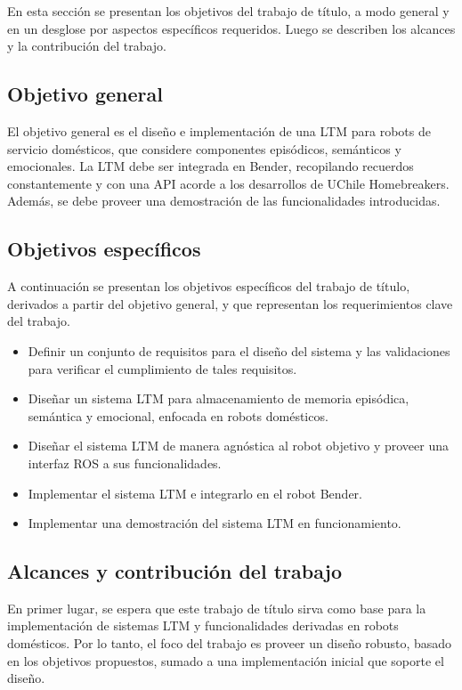 En esta sección se presentan los objetivos del trabajo de título, a modo general y en un desglose por aspectos específicos requeridos. Luego se describen los alcances y la contribución del trabajo. 

\subsection{Objetivo general}

El objetivo general es el diseño e implementación de una LTM para robots de servicio domésticos, que considere componentes episódicos, semánticos y emocionales. La LTM debe ser integrada en Bender, recopilando recuerdos constantemente y con una API acorde a los desarrollos de UChile Homebreakers. Además, se debe proveer una demostración de las funcionalidades introducidas.


\subsection{Objetivos específicos}

A continuación se presentan los objetivos específicos del trabajo de título, derivados a partir del objetivo general, y que representan los requerimientos clave del trabajo.
\begin{itemize}
	\item Definir un conjunto de requisitos para el diseño del sistema y las validaciones para verificar el cumplimiento de tales requisitos.
	\item Diseñar un sistema LTM para almacenamiento de memoria episódica, semántica y emocional, enfocada en robots domésticos.
	\item Diseñar el sistema LTM de manera agnóstica al robot objetivo y proveer una interfaz ROS a sus funcionalidades.
	\item Implementar el sistema LTM e integrarlo en el robot Bender.
	\item Implementar una demostración del sistema LTM en funcionamiento.
\end{itemize}


\subsection{Alcances y contribución del trabajo}

En primer lugar, se espera que este trabajo de título sirva como base para la implementación de sistemas LTM y funcionalidades derivadas en robots domésticos. Por lo tanto, el foco del trabajo es proveer un diseño robusto, basado en los objetivos propuestos, sumado a una implementación inicial que soporte el diseño. 

